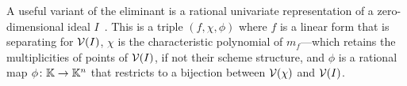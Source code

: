 A useful variant of the eliminant is a rational univariate representation of a zero-dimension\-al ideal $I$~\cite[???]{BPR}.
This is a triple $(f,\chi,\phi)$ where $f$ is a linear form that is separating for $\mathcal{V}(I)$, $\chi$ is the characteristic
polynomial of $m_f$---which retains the multiplicities of points of $\mathcal{V}(I)$, if not their scheme structure, and $\phi$
is a rational map $\phi\colon\mathbb{K}\to\mathbb{K}^n$ that restricts to a bijection between $\mathcal{V}(\chi)$ and $\mathcal{V}(I)$.
%
\begin{leftbar}

\end{leftbar}
%
